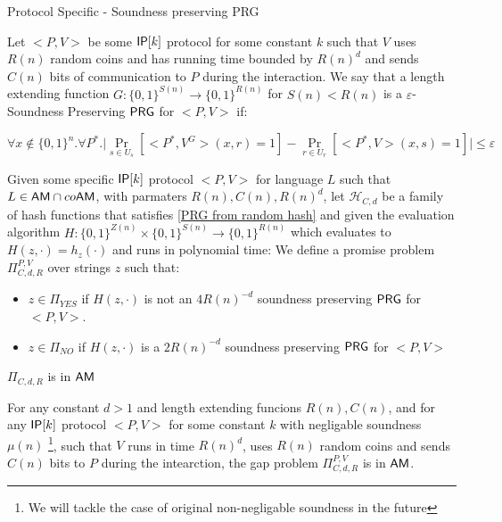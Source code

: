 \documentclass[11]{article}
\begin{document}
\begin{definition}{Protocol Specific - Soundness preserving PRG}

Let $<P,V>$  be some $\mathsf{IP}[k]$ protocol for some constant $k$ such that $V$ uses $R(n)$ random coins and has running time bounded by $R(n)^d$ and sends $C(n)$ bits of communication to $P$ during the interaction. We say that a length extending function $G:\{0,1\}^{S(n)} \to \{0,1\}^{R(n)}$ for $S(n) < R(n)$ is a $\varepsilon$-Soundness Preserving $\mathsf{PRG}$ for $<P,V>$ if:

$$ \forall{x \notin \{0,1\}^n}. \forall{P^*}. \bigg|\Pr_{s \in U_s}[<P^*,V^G>(x, r) = 1] - \Pr_{r \in U_r}[<P^*, V>(x, s) = 1]\bigg| \leq \varepsilon$$
	
\end{definition}

Given some specific $\mathsf{IP}[k]$ protocol $<P,V>$ for language $L$ such that $L \in \mathsf{AM} \cap co\mathsf{AM}$, with parmaters $R(n), C(n), R(n)^d$,  let $\mathcal{H}_{C,d}$ be a family of hash functions that satisfies \ref{PRG from random hash} and given the evaluation algorithm $H: \{0,1\}^{Z(n)} \times \{0,1\}^{S(n)} \to \{0,1\}^{R(n)}$ which evaluates to $H(z, \cdot) = h_z(\cdot)$ and runs in polynomial time:
We define a promise problem $\Pi_{C,d,R}^{P,V}$ over strings $z$ such that:
\begin{itemize}
	\item $z \in \Pi_{YES}$ if $H(z, \cdot)$ is not an $4R(n)^{-d}$ soundness preserving $\mathsf{PRG}$ for $<P,V>$.
	\item $z \in \Pi_{NO}$ if $H(z, \cdot)$ is a $2R(n)^{-d}$ soundness preserving $\mathsf{PRG}$ for $<P,V>$
\end{itemize}

\begin{claim} {$\Pi_{C,d,R}$ is in $\mathsf{AM}$}

For any constant $d > 1$ and length extending funcions $R(n), C(n)$, and for any $\mathsf{IP}[k]$ protocol $<P,V>$ for some constant $k$ with negligable soundness $\mu(n)$ \footnote{We will tackle the case of original non-negligable soundness in the future}, such that $V$ runs in time $R(n)^d$, uses $R(n)$ random coins and sends $C(n)$ bits to $P$ during the intearction, the gap problem $\Pi_{C,d,R}^{P,V}$ is in $\mathsf{AM}$.

\end{claim}
\end{document}
